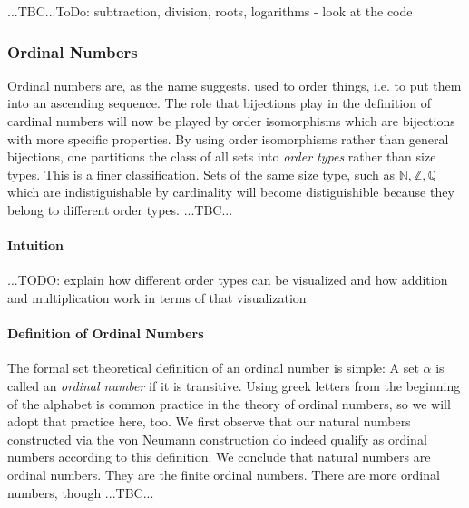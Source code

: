 ...TBC...ToDo: subtraction, division, roots, logarithms - look at the code







%



\subsubsection{Ordinal Numbers}
Ordinal numbers are, as the name suggests, used to order things, i.e. to put them into an ascending sequence. The role that bijections play in the definition of cardinal numbers will now be played by order isomorphisms which are bijections with more specific properties. By using order isomorphisms rather than general bijections, one partitions the class of all sets into \emph{order types} rather than size types. This is a finer classification. Sets of the same size type, such as $\mathbb{N}, \mathbb{Z}, \mathbb{Q}$ which are indistiguishable by cardinality will become distiguishible because they belong to different order types. ...TBC...


\paragraph{Intuition} ...TODO: explain how different order types can be visualized and how addition and multiplication work in terms of that visualization

\paragraph{Definition of Ordinal Numbers}
The formal set theoretical definition of an ordinal number is simple: A set $\alpha$ is called an \emph{ordinal number} if it is transitive. Using greek letters from the beginning of the alphabet is common practice in the theory of ordinal numbers, so we will adopt that practice here, too. We first observe that our natural numbers constructed via the von Neumann construction do indeed qualify as ordinal numbers according to this definition. We conclude that natural numbers are ordinal numbers. They are the finite ordinal numbers. There are more ordinal numbers, though ...TBC...

